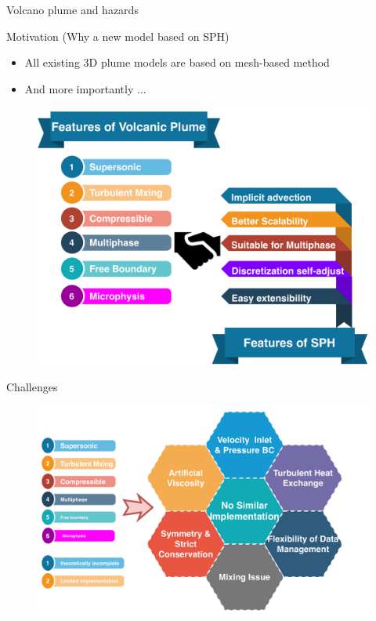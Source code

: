 \documentclass{beamer}
\begin{document}
\begin{frame}{Volcano plume and hazards}
\end{frame}

\begin{frame}{Motivation (Why a new model based on SPH)}
\begin{itemize}
\item All existing 3D plume models are based on mesh-based method
\item And more importantly ...
\end{itemize}

\begin{figure}
\centering
\includegraphics[width=.72\textwidth]{./PPT/Why_SPH}
\end{figure}
\end{frame}

\begin{frame}{Challenges}
\noindent
\begin{figure}
\centering
\includegraphics[width=.95\textwidth]{./PPT/Challenges}
\end{figure}
\end{frame}
\end{document}
